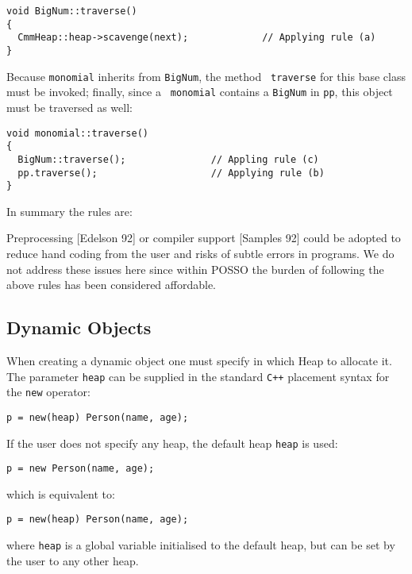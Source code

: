 \begin{verbatim}
void BigNum::traverse()
{
  CmmHeap::heap->scavenge(next);             // Applying rule (a)
}
\end{verbatim}
Because {\tt monomial} inherits from {\tt BigNum}, the method {\tt
traverse} for this base class must be invoked; finally, since a {\tt
monomial} contains a {\tt BigNum} in {\tt pp}, this object must be
traversed as well:

\begin{verbatim}
void monomial::traverse()
{
  BigNum::traverse();               // Appling rule (c)
  pp.traverse();                    // Applying rule (b)
}
\end{verbatim}

In summary the rules are:


Preprocessing [Edelson 92] or compiler support [Samples 92] could be
adopted to reduce hand coding from the user and risks of subtle errors
in programs. We do not address these issues here since within POSSO
the burden of following the above rules has been considered affordable.


\subsection{Dynamic Objects}

When creating a dynamic object one must specify in which Heap to
allocate it. The parameter {\tt heap} can be supplied in the standard
{\tt C++} placement syntax for the {\tt new} operator:
\begin{verbatim}
p = new(heap) Person(name, age); 
\end{verbatim}
If the user does not specify any heap, the default heap {\tt heap} is used:
\begin{verbatim}
p = new Person(name, age);
\end{verbatim}
which is equivalent to:
\begin{verbatim}
p = new(heap) Person(name, age);
\end{verbatim}
where {\tt heap} is a global 
variable initialised to the default heap, but can be set by the 
user to any other heap.

